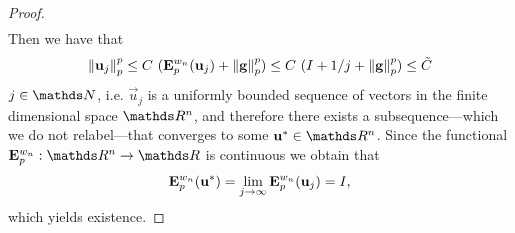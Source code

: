 \begin{proof}
\begin{align*}
\end{align*}
%
Then we have that
%
\begin{align*}
\left\|\mathbf{u}_j\right\|^p_p \leq C\ (\mathbf{E}^{w_n}_p(\mathbf{u}_j) + \left\|\mathbf{g}\right\|^p_p)
\leq C\ (I + 1/j + \left\|\mathbf{g}\right\|^p_p) \leq \tilde C
\end{align*}
%
$j\in\N$, i.e. $\vec u_j$ is a uniformly bounded sequence of vectors in the finite dimensional space $\R^n$, and therefore there exists a subsequence---which we do not relabel---that converges to some $\vec u^\ast\in\R^n$. Since the functional $\GE^{w_n}_p:\R^n\to\R$ is continuous we obtain that
%
\begin{align*}
\mathbf{E}^{w_n}_p(\mathbf{u}^\ast) = \lim_{j\to\infty} \mathbf{E}^{w_n}_p(\mathbf{u}_j) = I,
\end{align*}
%
which yields existence.
\end{proof}
%
%
